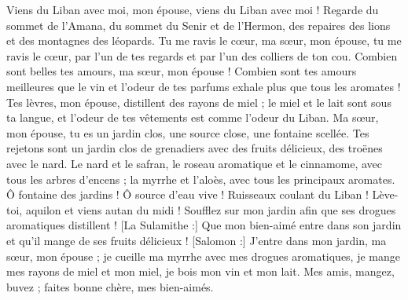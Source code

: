 \begin{multicols}{2}
Viens du Liban avec moi, mon épouse, viens du Liban avec moi ! Regarde du sommet de l'Amana, du sommet du Senir et de l'Hermon, des repaires des lions et des montagnes des léopards.
Tu me ravis le cœur, ma sœur, mon épouse, tu me ravis le cœur, par l'un de tes regards et par l'un des colliers de ton cou.
Combien sont belles tes amours, ma sœur, mon épouse ! Combien sont tes amours meilleures que le vin et l'odeur de tes parfums exhale plus que tous les aromates !
Tes lèvres, mon épouse, distillent des rayons de miel ; le miel et le lait sont sous ta langue, et l'odeur de tes vêtements est comme l'odeur du Liban.
Ma sœur, mon épouse, tu es un jardin clos, une source close, une fontaine scellée.
Tes rejetons sont un jardin clos de grenadiers avec des fruits délicieux, des troënes avec le nard.
Le nard et le safran, le roseau aromatique et le cinnamome, avec tous les arbres d'encens ; la myrrhe et l'aloès, avec tous les principaux aromates.
Ô fontaine des jardins ! Ô source d'eau vive ! Ruisseaux coulant du Liban !
Lève-toi, aquilon et viens autan du midi ! Soufflez sur mon jardin afin que ses drogues aromatiques distillent ! [La Sulamithe :] Que mon bien-aimé entre dans son jardin et qu'il mange de ses fruits délicieux !
\VerseOne{}[Salomon :] J'entre dans mon jardin, ma sœur, mon épouse ; je cueille ma myrrhe avec mes drogues aromatiques, je mange mes rayons de miel et mon miel, je bois mon vin et mon lait. Mes amis, mangez, buvez ; faites bonne chère, mes bien-aimés. 

\end{multicols}
